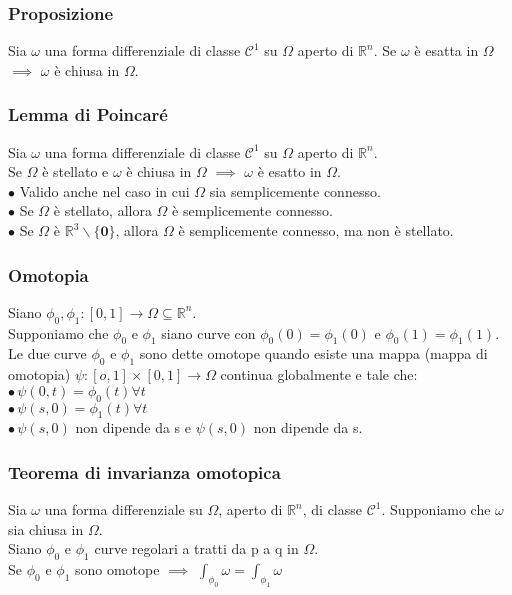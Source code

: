 \documentclass{article} %
\begin{document}
    \subsubsection*{Proposizione}
    Sia $\omega$ una forma differenziale di classe $\mathcal{C}^1$ su $\Omega$ aperto di $\mathbb{R}^n$.
    Se $\omega$ è esatta in $\Omega$ $\implies$ $\omega$ è chiusa in $\Omega$.

    \subsubsection*{Lemma di Poincaré}
    Sia $\omega$ una forma differenziale di classe $\mathcal{C}^1$ su $\Omega$ aperto di $\mathbb{R}^n$. \\
    Se $\Omega$ è stellato e $\omega$ è chiusa in $\Omega$ $\implies$ $\omega$ è esatto in $\Omega$.\\
    $\bullet$ Valido anche nel caso in cui $\Omega$ sia semplicemente connesso. \\
    $\bullet$ Se $\Omega$ è stellato, allora $\Omega$ è semplicemente connesso. \\
    $\bullet$ Se $\Omega$ è $\mathbb{R}^3\backslash \{\mathbf{0}\}$, allora $\Omega$ è semplicemente connesso, ma non è stellato.

    \subsubsection*{Omotopia}
    Siano $\phi_0, \phi_1:[0,1] \to \Omega \subseteq \mathbb{R}^n$. \\ Supponiamo che $\phi_0$ e $\phi_1$ siano curve con $\phi_0(0)=\phi_1(0)$ e $\phi_0(1)=\phi_1(1)$. \\ Le due curve $\phi_0$ e $\phi_1$ sono dette omotope quando esiste una mappa (mappa di omotopia) $\psi:[o,1] \times [0,1] \to \Omega$ continua globalmente e tale che: \\
    $\bullet \, \psi(0,t)=\phi_0(t) \forall t$ \\
    $\bullet \, \psi(s,0)=\phi_1(t) \forall t$ \\
    $\bullet \, \psi(s,0)$ non dipende da s e $\psi(s,0)$ non dipende da s.

    \subsubsection*{Teorema di invarianza omotopica}
    Sia $\omega$ una forma differenziale su $\Omega$, aperto di $\mathbb{R}^n$, di classe $\mathcal{C}^1$. Supponiamo che $\omega$ sia chiusa in $\Omega$. \\
    Siano $\phi_0$ e $\phi_1$ curve regolari a tratti da p a q in $\Omega$. \\
    Se $\phi_0$ e $\phi_1$ sono omotope $\implies$ $\int_{\phi_0} \omega = \int_{\phi_1} \omega$
\end{document}
